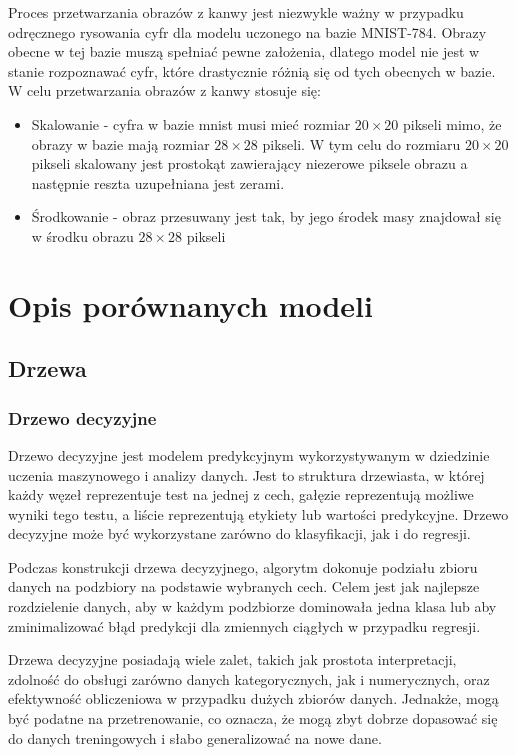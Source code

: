 \documentclass{article}
\begin{document}
Proces przetwarzania obrazów z kanwy jest niezwykle ważny
w przypadku odręcznego rysowania cyfr dla modelu uczonego
na bazie MNIST-784. Obrazy obecne w tej bazie muszą spełniać
pewne założenia, dlatego model nie jest w stanie rozpoznawać
cyfr, które drastycznie różnią się od tych obecnych w bazie.
W celu przetwarzania obrazów z kanwy stosuje się:
\begin{itemize}
    \item Skalowanie - cyfra w bazie mnist musi mieć rozmiar $20\times20$ pikseli mimo,
    że obrazy w bazie mają rozmiar $28\times28$ pikseli. W tym celu do rozmiaru $20\times20$
    pikseli skalowany jest prostokąt zawierający niezerowe piksele obrazu a następnie reszta uzupełniana jest zerami.
    \item Środkowanie - obraz przesuwany jest tak, by jego środek masy znajdował się w środku
    obrazu $28\times28$ pikseli
\end{itemize}


\section{Opis porównanych modeli}

\subsection{Drzewa}
\subsubsection{Drzewo decyzyjne}
Drzewo decyzyjne jest modelem predykcyjnym wykorzystywanym w 
dziedzinie uczenia maszynowego i analizy danych. Jest to 
struktura drzewiasta, w której każdy węzeł reprezentuje 
test na jednej z cech, gałęzie reprezentują możliwe wyniki 
tego testu, a liście reprezentują etykiety lub wartości 
predykcyjne. Drzewo decyzyjne może być wykorzystane 
zarówno do klasyfikacji, jak i do regresji.

Podczas konstrukcji drzewa decyzyjnego, 
algorytm dokonuje podziału zbioru danych 
na podzbiory na podstawie wybranych cech. 
Celem jest jak najlepsze rozdzielenie danych, 
aby w każdym podzbiorze dominowała jedna klasa 
lub aby zminimalizować błąd predykcji dla zmiennych 
ciągłych w przypadku regresji.

Drzewa decyzyjne posiadają wiele zalet, takich jak 
prostota interpretacji, zdolność do obsługi zarówno 
danych kategorycznych, jak i numerycznych, oraz efektywność 
obliczeniowa w przypadku dużych zbiorów danych. Jednakże, 
mogą być podatne na przetrenowanie, co oznacza, że mogą zbyt 
dobrze dopasować się do danych treningowych i słabo generalizować na nowe dane.
\end{document}
